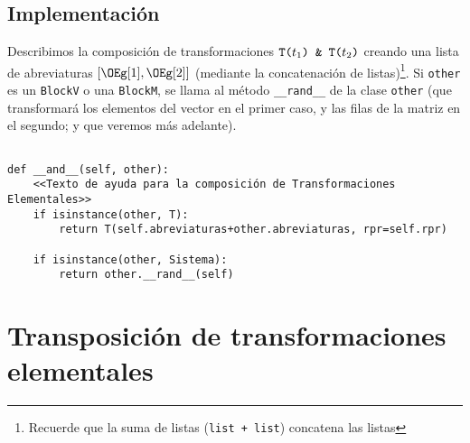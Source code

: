 \documentclass[11pt]{report}
\begin{document}
\subsection{Implementación}
\label{sec:orgaf20037}

Describimos la composición de transformaciones
\begin{math}
  \text{\tt{T(}}t_1\text{\tt{) \& T(}}t_{2}\text{\tt{)}}
\end{math}
creando una lista de abreviaturas \([\OEg[1],\OEg[2]]\) (mediante la
concatenación de listas)\footnote{Recuerde que la suma de listas
(\texttt{list + list}) concatena las listas}. Si \texttt{other} es un
\texttt{BlockV} o una \texttt{BlockM}, se llama al método \texttt{\_\_rand\_\_} de la clase
\texttt{other} (que transformará los elementos del vector en el primer caso,
y las filas de la matriz en el segundo; y que veremos más adelante).

\begin{verbatim}

def __and__(self, other):
    <<Texto de ayuda para la composición de Transformaciones Elementales>>
    if isinstance(other, T):
        return T(self.abreviaturas+other.abreviaturas, rpr=self.rpr)

    if isinstance(other, Sistema):
        return other.__rand__(self)

\end{verbatim}

\section{Transposición de transformaciones elementales}
\label{sec:org79aa494}
\end{document}
